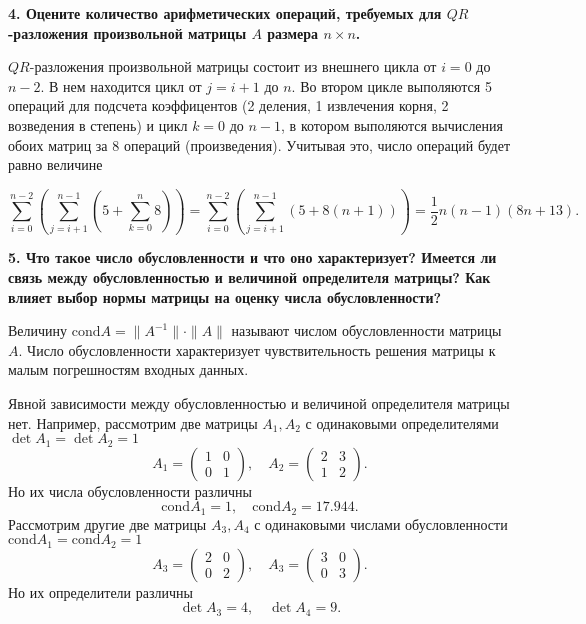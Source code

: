 \documentclass[12pt, a4paper]{article}
\begin{document}
	\textbf{4. Оцените количество арифметических операций, требуемых для $QR$-разложения произвольной матрицы $A$ размера $n \times n$.  }
	
	$QR$-разложения произвольной матрицы состоит из внешнего цикла от $i=0$ до $n-2$. В нем находится цикл от $j=i+1$ до $n$. Во втором цикле выполяются 5 операций для подсчета коэффицентов (2 деления, 1 извлечения корня, 2 возведения в степень) и цикл $k=0$ до $n-1$, в котором выполяются вычисления обоих матриц за 8 операций (произведения). Учитывая это, число операций будет равно величине 
	
	\[
	\sum\limits_{i=0}^{n-2} \left(\sum\limits_{j=i+1}^{n-1} \left(5+\sum\limits_{k=0}^{n}8\right)\right)=\sum\limits_{i=0}^{n-2} \left(\sum\limits_{j=i+1}^{n-1} \left(5+8\left(n+1\right)\right)\right)= \dfrac{1}{2}n(n-1)(8n+13).
	\]
	
	\textbf{5. Что такое число обусловленности и что оно характеризует? Имеется ли связь между обусловленностью и величиной определителя матрицы? Как влияет выбор нормы матрицы на оценку числа обусловленности? }
	
	Величину $\mathrm{cond} A = \| A^{-1} \| \cdot \| A \|$ называют числом обусловленности матрицы $A$. Число обусловленности характеризует чувствительность решения матрицы к малым погрешностям входных данных. 
	
	Явной зависимости между обусловленностью и величиной определителя матрицы нет. Например, рассмотрим две матрицы $A_1,A_2$ с одинаковыми определителями $\det A_1= \det A_2=1$
	\[ 
	A_1=
	\begin{pmatrix}
		1 & 0\\
		0 & 1
	\end{pmatrix},
	\quad
	A_2=
	\begin{pmatrix}
		2 & 3\\
		1 & 2
	\end{pmatrix}.
	\]
	Но их числа обусловленности различны
	\[ 
	\mathrm{cond} A_1=1,
	\quad
	\mathrm{cond} A_2=17.944.
	\]
	Рассмотрим другие две матрицы $A_3,A_4$ с одинаковыми числами обусловленности $\mathrm{cond} A_1=\mathrm{cond} A_2=1$
	\[ 
	A_3=
	\begin{pmatrix}
		2 & 0\\
		0 & 2
	\end{pmatrix},
	\quad
	A_3=
	\begin{pmatrix}
		3 & 0\\
		0 & 3
	\end{pmatrix}.
	\]
	Но их определители различны
	\[ 
	\det A_3=4,
	\quad
	\det A_4=9.
	\]
	
\end{document}
